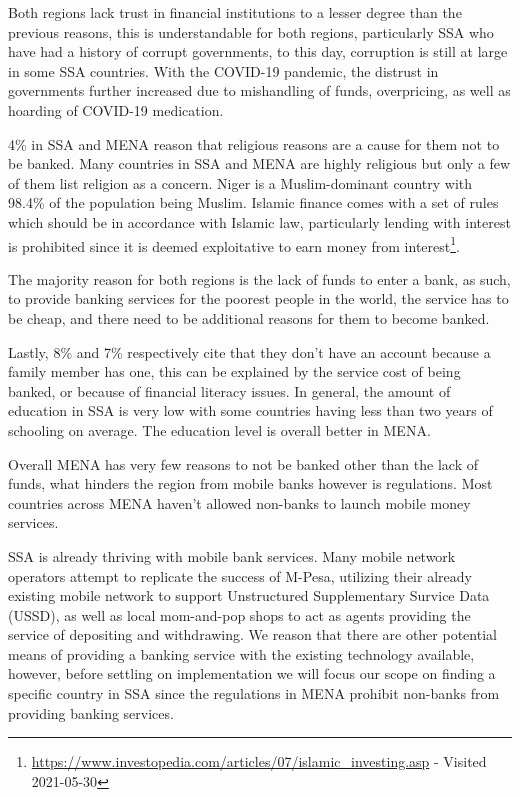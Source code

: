 \documentclass[11pt, a4paper]{article}
\begin{document}
Both regions lack trust in financial institutions to a lesser degree than the previous reasons, this is understandable for both regions, particularly SSA who have had a history of corrupt governments, to this day, corruption is still at large in some SSA countries. With the COVID-19 pandemic, the distrust in governments further increased due to mishandling of funds, overpricing, as well as hoarding of COVID-19 medication\cite{cpi2020}.

4\% in SSA and MENA reason that religious reasons are a cause for them not to be banked. Many countries in SSA and MENA are highly religious but only a few of them list religion as a concern. Niger is a Muslim-dominant country with 98.4\% of the population being Muslim\cite{muslim}. Islamic finance comes with a set of rules which should be in accordance with Islamic law, particularly lending with interest is prohibited since it is deemed exploitative to earn money from interest\footnote{\url{https://www.investopedia.com/articles/07/islamic\_investing.asp} - Visited 2021-05-30}.

The majority reason for both regions is the lack of funds to enter a bank, as such, to provide banking services for the poorest people in the world, the service has to be cheap, and there need to be additional reasons for them to become banked.

Lastly, 8\% and 7\% respectively cite that they don't have an account because a family member has one, this can be explained by the service cost of being banked, or because of financial literacy issues. In general, the amount of education in SSA is very low with some countries having less than two years of schooling on average\cite{hdr}. The education level is overall better in MENA\cite{hdr}.

Overall MENA has very few reasons to not be banked other than the lack of funds, what hinders the region from mobile banks however is regulations. Most countries across MENA haven't allowed non-banks to launch mobile money services.\cite{gsmareg}

SSA is already thriving with mobile bank services. Many mobile network operators attempt to replicate the success of M-Pesa, utilizing their already existing mobile network to support Unstructured Supplementary Survice Data (USSD), as well as local mom-and-pop shops to act as agents providing the service of depositing and withdrawing. We reason that there are other potential means of providing a banking service with the existing technology available, however, before settling on implementation we will focus our scope on finding a specific country in SSA since the regulations in MENA prohibit non-banks from providing banking services.
\end{document}
